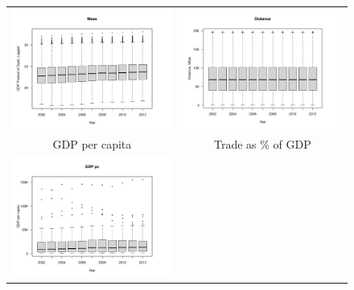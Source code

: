 \documentclass[reqno,onecolumn,letterpaper,12pt]{article}
\begin{document}
\begin{figure}[htp]
\begin{tabular}{c@{\hskip -.4cm}c}
\includegraphics[height=.2\textheight, clip=true, trim=1cm 1cm 0cm 1.6cm]{draft_figures/descriptive_plots/mass.pdf}    &
\includegraphics[height=.2\textheight, clip=true, trim=1cm 1cm 0cm 1.6cm]{draft_figures/descriptive_plots/distance.pdf}   \\
GDP per capita &
Trade as \% of GDP\\
\includegraphics[height=.2\textheight, clip=true, trim=1cm 1cm 0cm 1.6cm]{draft_figures/descriptive_plots/GDPpc.pdf}    &

\end{tabular}
\end{figure}
\end{document}
